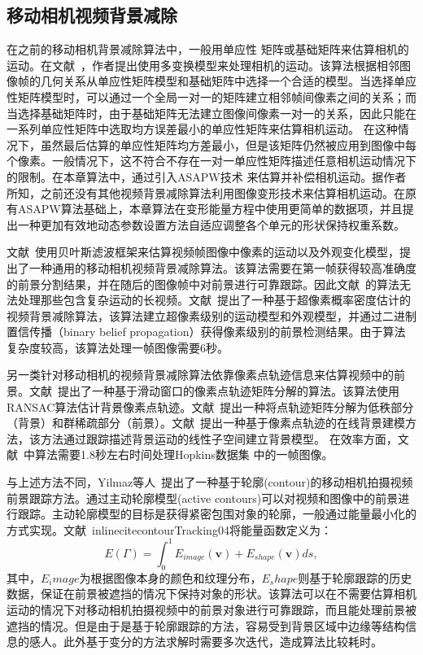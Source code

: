 \subsection{移动相机视频背景减除}
\label{ch4:sec:sub:mcbs}
在之前的移动相机背景减除算法中，一般用单应性 矩阵或基础矩阵来估算相机的运动。在文献~，作者提出使用多变换模型来处理相机的运动。该算法根据相邻图像帧的几何关系从单应性矩阵模型和基础矩阵中选择一个合适的模型。当选择单应性矩阵模型时，可以通过一个全局一对一的矩阵建立相邻帧间像素之间的关系；而当选择基础矩阵时，由于基础矩阵无法建立图像间像素一对一的关系，因此只能在一系列单应性矩阵中选取均方误差最小的单应性矩阵来估算相机运动。 在这种情况下，虽然最后估算的单应性矩阵均方差最小，但是该矩阵仍然被应用到图像中每个像素。一般情况下，这不符合不存在一对一单应性矩阵描述任意相机运动情况下的限制。在本章算法中，通过引入ASAPW技术 \cite{Liu2009ASAP,Liu_2013ASAP}来估算并补偿相机运动。据作者所知，之前还没有其他视频背景减除算法利用图像变形技术来估算相机运动。在原有ASAPW算法基础上，本章算法在变形能量方程中使用更简单的数据项，并且提出一种更加有效地动态参数设置方法自适应调整各个单元的形状保持权重系数。 \par

文献~使用贝叶斯滤波框架来估算视频帧图像中像素的运动以及外观变化模型，提出了一种通用的移动相机视频背景减除算法。该算法需要在第一帧获得较高准确度的前景分割结果，并在随后的图像帧中对前景进行可靠跟踪。因此文献~的算法无法处理那些包含复杂运动的长视频。文献~提出了一种基于超像素概率密度估计的视频背景减除算法，该算法建立超像素级别的运动模型和外观模型，并通过二进制置信传播（binary belief propagation）获得像素级别的前景检测结果。由于算法复杂度较高，该算法处理一帧图像需要6秒。\par

另一类针对移动相机的视频背景减除算法依靠像素点轨迹信息来估算视频中的前景。文献~提出了一种基于滑动窗口的像素点轨迹矩阵分解的算法。该算法使用RANSAC\cite{Ransac}算法估计背景像素点轨迹。文献~提出一种将点轨迹矩阵分解为低秩部分（背景）和群稀疏部分（前景）。文献~提出一种基于像素点轨迹的在线背景建模方法，该方法通过跟踪描述背景运动的线性子空间建立背景模型。 在效率方面，文献~中算法需要1.8秒左右时间处理Hopkins数据集\cite{HopKinsDataSet} 中的一帧图像。\par

与上述方法不同，Yilmaz等人~\cite{contourTracking04}提出了一种基于轮廓(contour)的移动相机拍摄视频前景跟踪方法。通过主动轮廓模型(active contours)\cite{Snakes}可以对视频和图像中的前景进行跟踪。主动轮廓模型的目标是获得紧密包围对象的轮廓，一般通过能量最小化的方式实现。文献~inlinecite{contourTracking04}将能量函数定义为：
$$ E(\Gamma) = \int_{0}^{1} E_{image}(\mathbf{v})+ E_{shape}(\mathbf{v}) ds,$$
其中，$E_image$为根据图像本身的颜色和纹理分布，$E_shape$则基于轮廓跟踪的历史数据，保证在前景被遮挡的情况下保持对象的形状。该算法可以在不需要估算相机运动的情况下对移动相机拍摄视频中的前景对象进行可靠跟踪，而且能处理前景被遮挡的情况。但是由于是基于轮廓跟踪的方法，容易受到背景区域中边缘等结构信息的感人。此外基于变分的方法求解时需要多次迭代，造成算法比较耗时。

